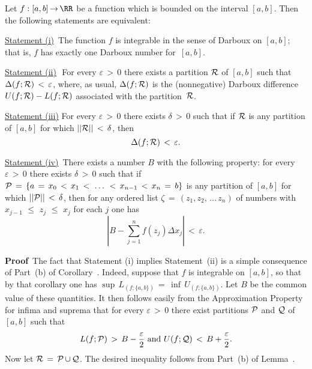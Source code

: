 \V

        Let $f:[a,b] \,{\rightarrow}\, {\RR}$ be a function which is bounded on the interval $[a,b]$. Then the following statements are equivalent:

\V

        \underline{Statement (i)}\,\,\,The function $f$ is integrable in the sense of Darboux on $[a,b]$;
    that is, $f$ has exactly one Darboux number for~$[a,b]$.

\V

        \underline{Statement (ii)}\,\, For every ${\varepsilon}\,>\,0$ there exists a partition
    ${\cal R}$ of $[a,b]$ such that ${\Delta}(f;{\cal R})\,<\,{\varepsilon}$, where, as usual,
    ${\Delta}(f;{\cal R})$ is the (nonnegative) Darboux difference $U(f;{\cal R}) - L(f;{\cal R})$ associated with the partition~${\cal R}$.

\V


        \underline{Statement (iii)} For every ${\varepsilon}\,>\,0$ there exists ${\delta}\,>\,0$ such that if ${\cal R}$ is any partition of $[a,b]$ for which $||{\cal R}||\,<\,{\delta}$, then 
        \begin{displaymath}
        {\Delta}(f;{\cal R})\,<\,{\varepsilon}.
        \end{displaymath}


\V

        \underline{Statement (iv)}\, There exists a number $B$ with the following property: for every ${\varepsilon}\,>\,0$
    there exists ${\delta}\,>\,0$ such that if ${\cal P} \,=\, \{a \,=\, x_{0}\,<\,x_{1}\,<\,\,{\ldots}\,\,<\,x_{n-1}\,<\,x_{n} \,=\, b\}$
    is any partition of $[a,b]$ for which $||{\cal P}||\,<\,{\delta}$, then for any ordered list ${\zeta} \,=\, (z_{1}, z_{2},\,{\ldots}\,z_{n})$
    of numbers with $x_{j-1}\,\,{\leq}\,\,z_{j}\,\,{\leq}\,\,x_{j}$ for each $j$ one has
        \begin{displaymath}
        \left|B - \sum_{j=1}^{n} f(z_{j}){\Delta}x_{j}\right|\,<\,{\varepsilon}.
        \end{displaymath}



\V%

        {\bf Proof}\, The fact that Statement (i) implies Statement~(ii) is a simple consequence of Part~(b) of Corollary~.
    Indeed, suppose that $f$ is integrable on $[a,b]$, so that by that corollary one has ${\sup}\,L_{(f;\{a,b\})} \,=\, {\inf}\,U_{(f;\{a,b\})}$.
    Let $B$ be the common value of these quantities. It then follows easily from the Approximation Property for infima and suprema that for every ${\varepsilon}\,>\,0$
    there exist partitions ${\cal P}$ and ${\cal Q}$ of $[a,b]$ such that
        \begin{displaymath}
        L(f;{\cal P})\,>\,B-\frac{{\varepsilon}}{2} \mbox{ and } U(f;{\cal Q})\,<\,B+\frac{{\varepsilon}}{2}.
        \end{displaymath}
    Now let ${\cal R} \,=\, {\cal P} \,{\cup}\, {\cal Q}$. The desired inequality follows from Part~(b) of Lemma~.


